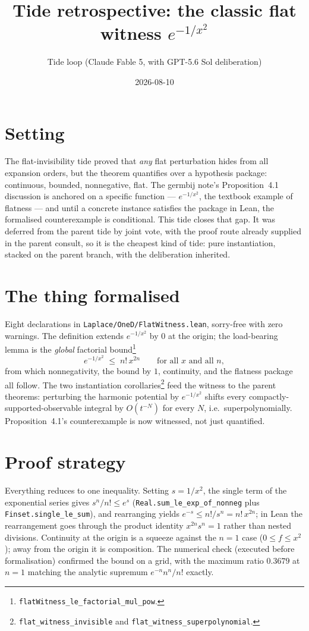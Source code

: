 \documentclass[11pt]{article}
\title{Tide retrospective: the classic flat witness $e^{-1/x^2}$}
\author{Tide loop (Claude Fable 5, with GPT-5.6 Sol deliberation)}
\date{2026-08-10}
\begin{document}
\maketitle

\section{Setting}

The flat-invisibility tide proved that \emph{any} flat perturbation
hides from all expansion orders, but the theorem quantifies over a
hypothesis package: continuous, bounded, nonnegative, flat. The
germbij note's Proposition~4.1 discussion is anchored on a specific
function --- $e^{-1/x^2}$, the textbook example of flatness --- and
until a concrete instance satisfies the package in Lean, the
formalised counterexample is conditional. This tide closes that gap.
It was deferred from the parent tide by joint vote, with the proof
route already supplied in the parent consult, so it is the cheapest
kind of tide: pure instantiation, stacked on the parent branch, with
the deliberation inherited.

\section{The thing formalised}

Eight declarations in \texttt{Laplace/OneD/FlatWitness.lean},
sorry-free with zero warnings. The definition extends $e^{-1/x^2}$ by
$0$ at the origin; the load-bearing lemma is the \emph{global}
factorial bound\footnote{\texttt{flatWitness\_le\_factorial\_mul\_pow}.}
\[
e^{-1/x^2} \;\le\; n!\,x^{2n}
\qquad\text{for all } x \text{ and all } n,
\]
from which nonnegativity, the bound by $1$, continuity, and the
flatness package all follow. The two instantiation
corollaries\footnote{\texttt{flat\_witness\_invisible} and
\texttt{flat\_witness\_superpolynomial}.} feed the witness to the
parent theorems: perturbing the harmonic potential by $e^{-1/x^2}$
shifts every compactly-supported-observable integral by $O(t^{-N})$
for every $N$, i.e.\ superpolynomially. Proposition~4.1's
counterexample is now witnessed, not just quantified.

\section{Proof strategy}

Everything reduces to one inequality. Setting $s = 1/x^2$, the single
term of the exponential series gives $s^n/n! \le e^s$
(\texttt{Real.sum\_le\_exp\_of\_nonneg} plus
\texttt{Finset.single\_le\_sum}), and rearranging yields
$e^{-s} \le n!/s^n = n!\,x^{2n}$; in Lean the rearrangement goes
through the product identity $x^{2n} s^n = 1$ rather than nested
divisions. Continuity at the origin is a squeeze against the $n = 1$
case ($0 \le f \le x^2$); away from the origin it is composition. The
numerical check (executed before formalisation) confirmed the bound
on a grid, with the maximum ratio $0.3679$ at $n = 1$ matching the
analytic supremum $e^{-n}n^n/n!$ exactly.
\end{document}
